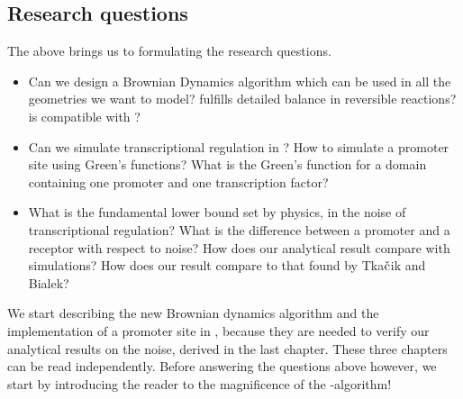 \subsection{Research questions}
The above brings us to formulating the research questions.
\begin{itemize}
 \item Can we design a Brownian Dynamics algorithm which
 \subitem can be used in all the geometries we want to model?
 \subitem fulfills detailed balance in reversible reactions?
 \subitem is compatible with \GFRD ?

 \item Can we simulate transcriptional regulation in \GFRD ?
 \subitem How to simulate a promoter site using Green's functions?
 \subitem What is the Green's function for a domain containing one promoter and one transcription factor?

 \item What is the fundamental lower bound set by physics, in the noise of transcriptional regulation?
 \subitem What is the difference between a promoter and a receptor with respect to noise?
 \subitem How does our analytical result compare with simulations? 
 \subitem How does our result compare to that found by Tka$\check{\rm c}$ik and Bialek?
\end{itemize}
We start describing the new Brownian dynamics algorithm and the implementation of a promoter site in \GFRD, because they are needed to verify our analytical results on the noise, derived in the last chapter. These three chapters can be read independently. Before answering the questions above however, we start by introducing the reader to the magnificence of the \GFRD -algorithm!










